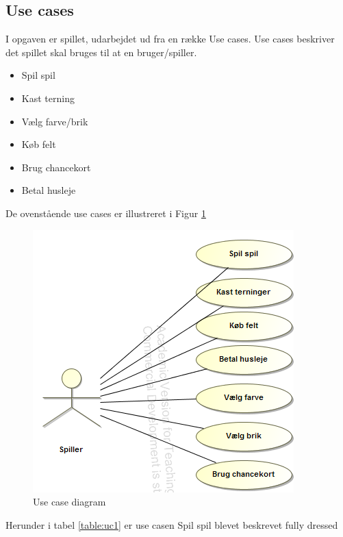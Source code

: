 \subsection{Use cases}


I opgaven er spillet, udarbejdet ud fra en række Use cases. Use cases beskriver det spillet skal bruges til at en bruger/spiller. 

\begin{itemize}
    \item Spil spil
    \item Kast terning
    \item Vælg farve/brik
    \item Køb felt
    \item Brug chancekort
    \item Betal husleje
\end{itemize}

De ovenstående use cases er illustreret i Figur \ref{fig:ucDiagram}

\begin{figure}[!h]
    \centering
    \includegraphics[]{sources/5_analyse/diagram.PNG}
    \caption{Use case diagram}
    \label{fig:ucDiagram}
\end{figure}


\newpage
Herunder i tabel \ref{table:uc1} er use casen Spil spil blevet beskrevet fully dressed


